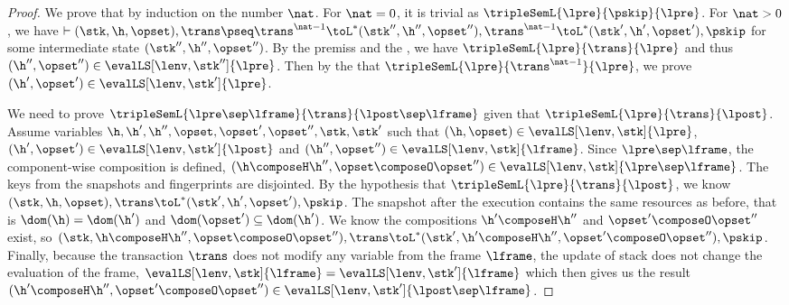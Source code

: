 \begin{proof}
We prove that by induction on the number \( \nat \).
For \( \nat = 0 \), it is trivial as \( \tripleSemL{\lpre}{\pskip}{\lpre} \).
For \( \nat > 0 \), we have \( \vdash (\stk, \h, \opset), \trans \pseq \trans^{\nat - 1} \toL^{*} (\stk'', \h'', \opset''), \trans^{\nat - 1} \toL^{*} (\stk', \h', \opset'), \pskip \) for some intermediate state \( ( \stk'', \h'', \opset'' ) \).
By the premiss and the \ih, we have \(\tripleSemL{\lpre}{\trans}{\lpre} \) and thus \(  (\h'', \opset'') \in \evalLS[\lenv, \stk'']{\lpre} \).
Then by the \ih that \(\tripleSemL{\lpre}{\trans^{\nat - 1}}{\lpre} \), we prove \(  (\h', \opset') \in \evalLS[\lenv, \stk']{\lpre} \).


We need to prove \( \tripleSemL{\lpre \sep \lframe }{\trans}{\lpost \sep \lframe} \) given that \( \tripleSemL{\lpre}{\trans}{\lpost} \).
Assume variables \( \h, \h', \h'', \opset, \opset', \opset'', \stk, \stk' \) such that \( ( \h, \opset ) \in \evalLS[\lenv, \stk]{\lpre} \), \( ( \h', \opset' ) \in \evalLS[\lenv, \stk']{\lpost} \) and \( ( \h'', \opset'' ) \in \evalLS[\lenv, \stk]{\lframe}\).
Since \( \lpre \sep \lframe \), the component-wise composition is defined, \ie \( (\h \composeH \h'', \opset \composeO \opset'') \in \evalLS[\lenv, \stk]{\lpre \sep \lframe} \).
The keys from the snapshots and fingerprints are disjointed.
By the hypothesis that \( \tripleSemL{\lpre}{\trans}{\lpost} \), we know \( ( \stk, \h, \opset ), \trans \toL^{*} ( \stk', \h', \opset' ), \pskip \).
The snapshot after the execution contains the same resources as before, that is \( \dom(\h) = \dom(\h') \) and \( \dom(\opset') \subseteq \dom(\h') \).
We know the compositions \( \h' \composeH \h''\) and \( \opset' \composeO \opset''\) exist, so \( ( \stk, \h \composeH \h'', \opset \composeO \opset''), \trans \toL^{*} ( \stk', \h' \composeH \h'', \opset' \composeO \opset'' ), \pskip \).
Finally, because the transaction \( \trans \) does not modify any variable from the frame \( \lframe \), the update of stack does not change the evaluation of the frame, \( \evalLS[\lenv, \stk]{\lframe} = \evalLS[\lenv, \stk']{\lframe} \) which then gives us the result \( (\h' \composeH \h'', \opset' \composeO \opset'') \in \evalLS[\lenv, \stk']{\lpost \sep \lframe} \).

\end{proof}
